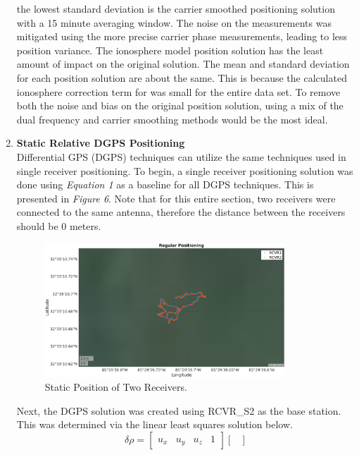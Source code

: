 \documentclass[11pt]{article}
\begin{document}
\begin{enumerate}[label=\textbf{\arabic*.}]
    the lowest standard deviation is the carrier smoothed positioning solution 
    with a 15 minute averaging window. The noise on the measurements was 
    mitigated using the more precise carrier phase measurements, leading to 
    less position variance. The ionosphere model position solution has the 
    least amount of impact on the original solution. The mean and standard 
    deviation for each position solution are about the same. This is because 
    the calculated ionosphere correction term for was small for the entire 
    data set. To remove both the noise and bias on the original position 
    solution, using a mix of the dual frequency and carrier smoothing methods 
    would be the most ideal.

  \item \textbf{Static Relative DGPS Positioning} \\
    Differential GPS (DGPS) techniques can utilize the same techniques used in single 
    receiver positioning. To begin, a single receiver positioning solution was 
    done using \emph{Equation 1} as a baseline for all DGPS techniques. This is 
    presented in \emph{Figure 6}. Note that for this entire section, two receivers 
    were connected to the same antenna, therefore the distance between the receivers 
    should be 0 meters.
    \begin{figure}[H]
      \centering
      \includegraphics[width=0.85\textwidth]{p2_a.png}
      \caption{Static Position of Two Receivers.}
    \end{figure}
    Next, the DGPS solution was created using RCVR\_S2 as the base station. This was 
    determined via the linear least squares solution below.
    \begin{equation}
      \delta\rho = 
      \begin{bmatrix}
        u_x & u_y & u_z & 1
      \end{bmatrix}
      \begin{bmatrix}

\end{bmatrix}
\end{equation}
\end{enumerate}
\end{document}
